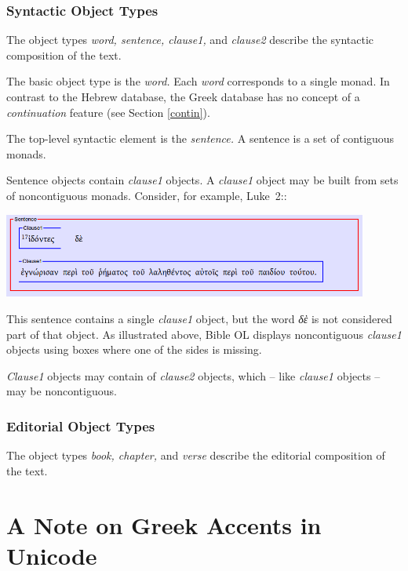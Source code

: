 \documentclass[11pt,oneside,a4paper]{memoir}
\newcommand*{\bibleref}[3]{#1~#2\thinspace:\thinspace#3}
\begin{document}
\subsubsection{Syntactic Object Types}

The object types \emph{word, sentence, clause1,} and \emph{clause2} describe the syntactic
composition of the text.

The basic object type is the \emph{word.} Each \emph{word} corresponds to a single monad. In
contrast to the Hebrew database, the Greek database has no concept of a \emph{continuation} feature
(see Section \ref{contin}).

The top-level syntactic element is the \emph{sentence.} A sentence is a set of contiguous monads.

Sentence objects contain \emph{clause1} objects. A \emph{clause1} object may be built from sets of
noncontiguous monads. Consider, for example, \bibleref{Luke}{2}{17}:

\begin{center}
  \includegraphics[width=0.9\textwidth]{luke2_17.png}
\end{center}

This sentence contains a single \emph{clause1} object, but the word \emph{δὲ} is not considered part
of that object. As illustrated above, Bible OL displays noncontiguous \emph{clause1} objects using
boxes where one of the sides is missing.

\emph{Clause1} objects may contain of \emph{clause2} objects, which -- like \emph{clause1} objects --
may be noncontiguous.

\subsubsection{Editorial Object Types}

The object types \emph{book, chapter,} and \emph{verse} describe the editorial composition of the
text.

\section{A Note on Greek Accents in Unicode}
\end{document}
